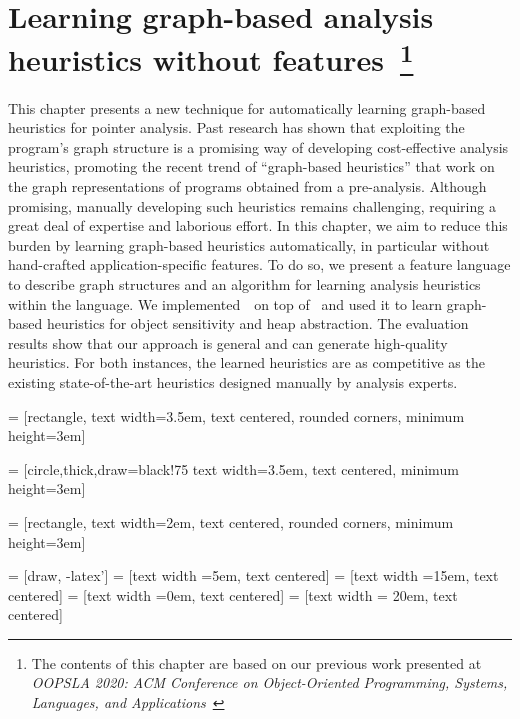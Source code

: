\chapter{Learning graph-based analysis heuristics without features~\footnote{The contents of this chapter are based on our previous work presented at \emph{OOPSLA 2020: ACM Conference on Object-Oriented Programming, Systems, Languages, and Applications}~\cite{Graphick20}}}\label{sec:Graphick}


This chapter presents a new technique for automatically learning graph-based heuristics for pointer analysis.
Past research has shown that exploiting the program's graph structure is a promising way of developing cost-effective analysis heuristics, promoting the recent trend of ``graph-based heuristics'' that work on the graph representations of programs obtained from a  pre-analysis. 
Although promising, manually developing such heuristics remains challenging, requiring a great deal of expertise and laborious effort.
In this chapter, we aim to reduce this burden by learning graph-based heuristics automatically, in particular without hand-crafted application-specific features. To do so, we present a feature language to describe graph structures and an algorithm for learning analysis heuristics within the language.
We implemented~\ourtool~on top of \Doop~and used it to learn graph-based heuristics for object sensitivity and heap abstraction.
The evaluation results show that our approach is general and can generate high-quality heuristics. For both instances,
the learned heuristics are as competitive as the existing state-of-the-art heuristics designed manually by analysis experts.







 = [rectangle,   text width=3.5em, text
centered, rounded corners, minimum height=3em]



 = [circle,thick,draw=black!75   text width=3.5em, text
centered, minimum height=3em]


 = [rectangle,   text width=2em, text
centered, rounded corners, minimum height=3em]

 = [draw, -latex']
 = [text width =5em, text centered]
 = [text width =15em, text centered]
 = [text width =0em, text centered]
 = [text width = 20em, text centered]

